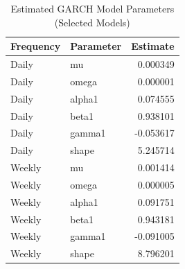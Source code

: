 \begin{table}[!h]
\centering
\caption{\label{tab:tab:garch_coef}Estimated GARCH Model Parameters (Selected Models)}
\centering
\begin{tabular}[t]{llr}
\toprule
Frequency & Parameter & Estimate\\
\midrule
Daily & mu & 0.000349\\
Daily & omega & 0.000001\\
Daily & alpha1 & 0.074555\\
Daily & beta1 & 0.938101\\
Daily & gamma1 & -0.053617\\
\addlinespace
Daily & shape & 5.245714\\
Weekly & mu & 0.001414\\
Weekly & omega & 0.000005\\
Weekly & alpha1 & 0.091751\\
Weekly & beta1 & 0.943181\\
\addlinespace
Weekly & gamma1 & -0.091005\\
Weekly & shape & 8.796201\\
\bottomrule
\end{tabular}
\end{table}
